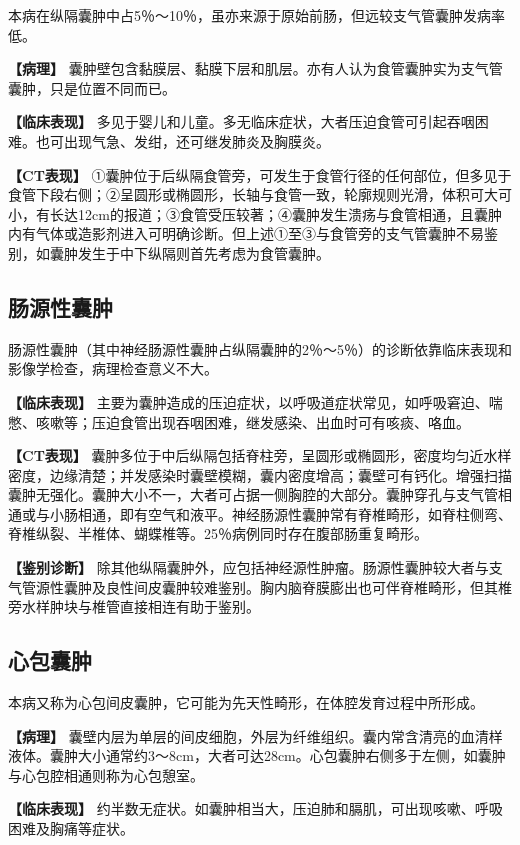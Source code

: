 本病在纵隔囊肿中占5％～10％，虽亦来源于原始前肠，但远较支气管囊肿发病率低。

\textbf{【病理】}
囊肿壁包含黏膜层、黏膜下层和肌层。亦有人认为食管囊肿实为支气管囊肿，只是位置不同而已。

\textbf{【临床表现】}
多见于婴儿和儿童。多无临床症状，大者压迫食管可引起吞咽困难。也可出现气急、发绀，还可继发肺炎及胸膜炎。

\textbf{【CT表现】}
①囊肿位于后纵隔食管旁，可发生于食管行径的任何部位，但多见于食管下段右侧；②呈圆形或椭圆形，长轴与食管一致，轮廓规则光滑，体积可大可小，有长达12cm的报道；③食管受压较著；④囊肿发生溃疡与食管相通，且囊肿内有气体或造影剂进入可明确诊断。但上述①至③与食管旁的支气管囊肿不易鉴别，如囊肿发生于中下纵隔则首先考虑为食管囊肿。

\subsection{肠源性囊肿}

肠源性囊肿（其中神经肠源性囊肿占纵隔囊肿的2％～5％）的诊断依靠临床表现和影像学检查，病理检查意义不大。

\textbf{【临床表现】}
主要为囊肿造成的压迫症状，以呼吸道症状常见，如呼吸窘迫、喘憋、咳嗽等；压迫食管出现吞咽困难，继发感染、出血时可有咳痰、咯血。

\textbf{【CT表现】}
囊肿多位于中后纵隔包括脊柱旁，呈圆形或椭圆形，密度均匀近水样密度，边缘清楚；并发感染时囊壁模糊，囊内密度增高；囊壁可有钙化。增强扫描囊肿无强化。囊肿大小不一，大者可占据一侧胸腔的大部分。囊肿穿孔与支气管相通或与小肠相通，即有空气和液平。神经肠源性囊肿常有脊椎畸形，如脊柱侧弯、脊椎纵裂、半椎体、蝴蝶椎等。25％病例同时存在腹部肠重复畸形。

\textbf{【鉴别诊断】}
除其他纵隔囊肿外，应包括神经源性肿瘤。肠源性囊肿较大者与支气管源性囊肿及良性间皮囊肿较难鉴别。胸内脑脊膜膨出也可伴脊椎畸形，但其椎旁水样肿块与椎管直接相连有助于鉴别。

\subsection{心包囊肿}

本病又称为心包间皮囊肿，它可能为先天性畸形，在体腔发育过程中所形成。

\textbf{【病理】}
囊壁内层为单层的间皮细胞，外层为纤维组织。囊内常含清亮的血清样液体。囊肿大小通常约3～8cm，大者可达28cm。心包囊肿右侧多于左侧，如囊肿与心包腔相通则称为心包憩室。

\textbf{【临床表现】}
约半数无症状。如囊肿相当大，压迫肺和膈肌，可出现咳嗽、呼吸困难及胸痛等症状。

